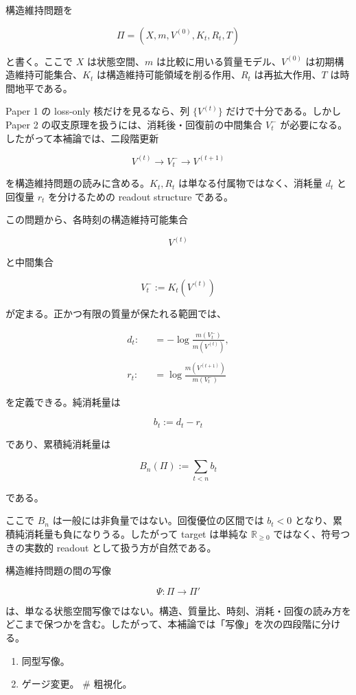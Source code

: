 \documentclass[12pt,a4paper]{article}
\begin{document}
構造維持問題を

\[
\Pi = (X,m,V^{(0)},K_{t},R_{t},T)
\]

と書く。ここで \(X\) は状態空間、\(m\) は比較に用いる質量モデル、\(V^{(0)}\) は初期構造維持可能集合、\(K_{t}\) は構造維持可能領域を削る作用、\(R_{t}\) は再拡大作用、\(T\) は時間地平である。

Paper 1 の loss-only 核だけを見るなら、列 \(\{V^{(t)}\}\) だけで十分である。しかし Paper 2 の収支原理を扱うには、消耗後・回復前の中間集合 \(V_{t}^-\) が必要になる。したがって本補論では、二段階更新

\[
V^{(t)} \longrightarrow V_{t}^- \longrightarrow V^{(t+1)}
\]

を構造維持問題の読みに含める。\(K_{t},R_{t}\) は単なる付属物ではなく、消耗量 \(d_{t}\) と回復量 \(r_{t}\) を分けるための readout structure である。

この問題から、各時刻の構造維持可能集合

\[
V^{(t)}
\]

と中間集合

\[
V_{t}^- := K_{t}(V^{(t)})
\]

が定まる。正かつ有限の質量が保たれる範囲では、

\[
\begin{aligned}
d_{t} :&= -\log \frac{m(V_{t}^-)}{m(V^{(t)})}, \\
\qquad \\
r_{t} :&= \log \frac{m(V^{(t+1)})}{m(V_{t}^-)}
\end{aligned}
\]

を定義できる。純消耗量は

\[
b_{t} := d_{t}-r_{t}
\]

であり、累積純消耗量は

\[
B_{n}(\Pi) := \sum_{t<n} b_{t}
\]

である。

ここで \(B_{n}\) は一般には非負量ではない。回復優位の区間では \(b_{t}<0\) となり、累積純消耗量も負になりうる。したがって target は単純な \(\mathbb{R}_{\ge0}\) ではなく、符号つきの実数的 readout として扱う方が自然である。

構造維持問題の間の写像

\[
\Psi:\Pi\to\Pi'
\]

は、単なる状態空間写像ではない。構造、質量比、時刻、消耗・回復の読み方をどこまで保つかを含む。したがって、本補論では「写像」を次の四段階に分ける。

\begin{enumerate}
\def\labelenumi{\arabic{enumi}.}
\tightlist
\item
  同型写像。
\item
  ゲージ変更。 \# 粗視化。
\end{enumerate}
\end{document}
